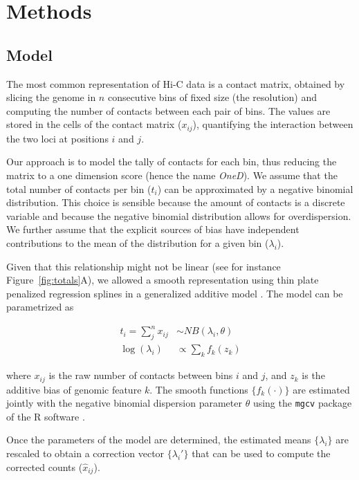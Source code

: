 \documentclass{article}
\begin{document}


\section{Methods}

\subsection{Model}
\label{sec:model}

The most common representation of Hi-C data is a contact matrix, obtained
by slicing the genome in $n$ consecutive bins of fixed size (the
resolution) and computing the number of contacts between each pair of
bins. The values are stored in the cells of the contact matrix ($x_{ij}$),
quantifying the interaction between the two loci at positions $i$ and
$j$.

Our approach is to model the tally of contacts for each bin, thus reducing
the matrix to a one dimension score (hence the name \textit{OneD}). We
assume that the total number of contacts per bin ($t_{i}$) can be
approximated by a negative binomial distribution. This choice is sensible
because the amount of contacts is a discrete variable and because the
negative binomial distribution allows for overdispersion. We further
assume that the explicit sources of bias have independent contributions to
the mean of the distribution for a given bin ($\lambda_i$).

Given that this relationship might not be linear (see for instance
Figure~\ref{fig:totals}A), we allowed a smooth representation
using thin plate penalized regression splines \citep{wood2003thin} in a
generalized additive model \citep{wood2011fast}. The model can be
parametrized as

\begin{align*}
t_i = \sum_j^n{x_{ij}} &\sim  NB(\lambda_i, \theta) \\
\log(\lambda_i) &\propto \sum_{k}{f_k(z_k)}
\end{align*}

\noindent
where $x_{ij}$ is the raw number of contacts between bins $i$ and $j$, and
$z_k$ is the additive bias of genomic feature $k$. The smooth functions
$\{f_k(\cdot)\}$ are estimated jointly with the negative binomial
dispersion parameter $\theta$ using the \texttt{mgcv} package
\citep{wood2011fast} of the R software \citep{coreteam2014r}.

Once the parameters of the model are determined, the estimated means
$\{\lambda_i\}$ are rescaled to obtain a correction vector
$\{\lambda_i'\}$ that can be used to compute the corrected counts
($\hat{x}_{ij}$).
\end{document}
